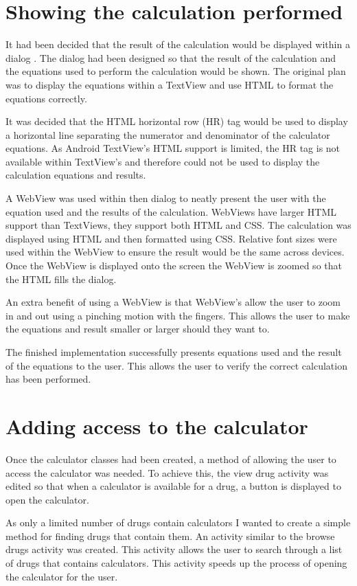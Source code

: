 \section{Showing the calculation performed}

It had been decided that the result of the calculation would be displayed within a dialog \cite{dialog}. The dialog had been designed so that the result of the calculation and the equations used to perform the calculation would be shown. The original plan was to display the equations within a TextView and use HTML to format the equations correctly.

It was decided that the HTML horizontal row (HR) tag would be used to display a horizontal line separating the numerator and denominator of the calculator equations. As Android TextView’s HTML support is limited, the HR tag is not available within TextView’s and therefore could not be used to display the calculation equations and results.

A WebView was used within then dialog to neatly present the user with the equation used and the results of the calculation. WebViews have larger HTML support than TextViews, they support both HTML and CSS. The calculation was displayed using HTML and then formatted using CSS. Relative font sizes were used within the WebView to ensure the result would be the same across devices. Once the WebView is displayed onto the screen the WebView is zoomed so that the HTML fills the dialog.

An extra benefit of using a WebView is that WebView’s allow the user to zoom in and out using a pinching motion with the fingers. This allows the user to make the equations and result smaller or larger should they want to.

The finished implementation successfully presents equations used and the result of the equations to the user. This allows the user to verify the correct calculation has been performed. 

\section{Adding access to the calculator}

Once the calculator classes had been created, a method of allowing the user to access the calculator was needed. To achieve this, the view drug activity was edited so that when a calculator is available for a drug, a button is displayed to open the calculator.

As only a limited number of drugs contain calculators I wanted to create a simple method for finding drugs that contain them. An activity similar to the browse drugs activity was created. This activity allows the user to search through a list of drugs that contains calculators. This activity speeds up the process of opening the calculator for the user.

